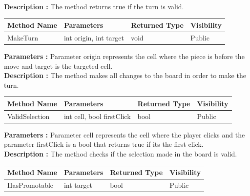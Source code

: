 \documentclass[12pt]{article}
\begin{document}
\textbf{Description :} The method returns true if the turn is valid.

\begin{table}[H]
    \begin{tabular}{|l|l|l|l|}
    \hline
    \rowcolor[HTML]{EFEFEF} 
    \cellcolor[HTML]{EFEFEF}\textbf{Method Name} & \textbf{Parameters}    & \textbf{Returned Type} & \textbf{Visibility} \\ \hline
    MakeTurn                                     & int origin, int target & void                   & Public              \\ \hline
    \end{tabular}
\end{table}

\textbf{Parameters :} Parameter origin represents the cell
where the piece is before the move and target is the targeted cell.
\\

\textbf{Description :} The method makes all changes to the board in order to make the turn.

\begin{table}[H]
    \begin{tabular}{|l|l|l|l|}
    \hline
    \rowcolor[HTML]{EFEFEF} 
    \cellcolor[HTML]{EFEFEF}\textbf{Method Name} & \textbf{Parameters}       & \textbf{Returned Type} & \textbf{Visibility} \\ \hline
    ValidSelection                               & int cell, bool firstClick & bool                   & Public              \\ \hline
    \end{tabular}
\end{table}

\textbf{Parameters :} Parameter cell represents the cell
where the player clicks and the parameter firstClick is a bool
that returns true if its the first click.
\\

\textbf{Description :} The method checks if the selection made
in the board is valid.

\begin{table}[H]
    \begin{tabular}{|l|l|l|l|}
    \hline
    \rowcolor[HTML]{EFEFEF} 
    \cellcolor[HTML]{EFEFEF}\textbf{Method Name} & \textbf{Parameters}     & \textbf{Returned Type} & \textbf{Visibility} \\ \hline
    HasPromotable                                & int target                    & bool                   & Public              \\ \hline
    \end{tabular}
\end{table}
\end{document}
